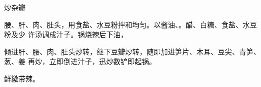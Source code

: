 \begin{recipe}{炒杂瓣}

\ingredients


\cooking

腰、肝、肉、肚头，用食盐、水豆粉拌和均匀。以酱油、。醋、白糖、食盐、水豆粉及少
许汤调成汁子。锅烧辣后下油，

倾进肝、腰、肉、肚头炒转，继下豆瓣炒转，随即加进笋片、木耳、豆尖、青笋、葱、姜
再炒，立即倒进汁子，迅炒数铲即起锅。

\notes

鲜繳带辣。

\end{recipe}

